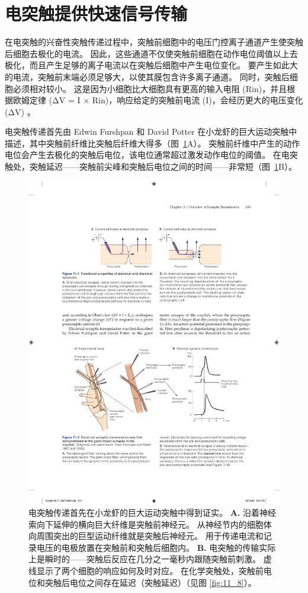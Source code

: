 \section{电突触提供快速信号传输}

在电突触的兴奋性突触传递过程中，突触前细胞中的电压门控离子通道产生使突触后细胞去极化的电流。
因此，这些通道不仅使突触前细胞在动作电位阈值以上去极化，而且产生足够的离子电流以在突触后细胞中产生电位变化。
要产生如此大的电流，突触前末端必须足够大，以使其膜包含许多离子通道。
同时，突触后细胞必须相对较小。
这是因为小细胞比大细胞具有更高的输入电阻 (Rin)，并且根据欧姆定律 (ΔV = I × Rin)，响应给定的突触前电流 (I)，会经历更大的电压变化 (ΔV) 。


电突触传递首先由 Edwin Furshpan 和 David Potter 在小龙虾的巨大运动突触中描述，其中突触前纤维比突触后纤维大得多（图~\ref{fig:11_2}A）。 
突触前纤维中产生的动作电位会产生去极化的突触后电位，该电位通常超过激发动作电位的阈值。
在电突触处，突触延迟——突触前尖峰和突触后电位之间的时间——非常短（图~\ref{fig:11_2}B）。


\begin{figure}[htbp]
	\centering
	\includegraphics[width=0.8\linewidth]{chap11/fig_11_2}
	\caption{电突触传递首先在小龙虾的巨大运动突触中得到证实\cite{furshpan1959transmission,furshpan1957mechanism}。 
		\textbf{A.} 沿着神经索向下延伸的横向巨大纤维是突触前神经元。
		从神经节内的细胞体向周围突出的巨型运动纤维就是突触后神经元。
		用于传递电流和记录电压的电极放置在突触前和突触后细胞内。
		\textbf{B.} 电突触的传输实际上是瞬时的——突触后反应在几分之一毫秒内跟随突触前刺激。
		虚线显示了两个细胞的响应如何及时对应。
		在化学突触处，突触前电位和突触后电位之间存在延迟（突触延迟）（见图 \ref{fig:11_8}）。}
	\label{fig:11_2}
\end{figure}


